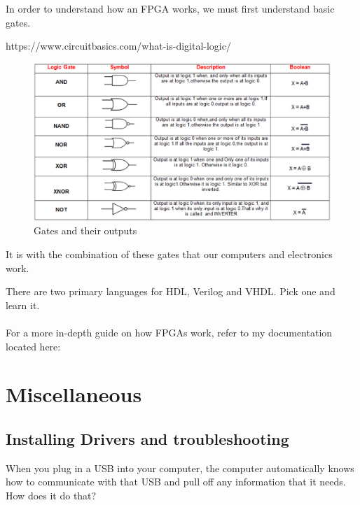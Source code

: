 \documentclass{article}
\begin{document}
In order to understand how an FPGA works, we must first understand basic gates.

https://www.circuitbasics.com/what-is-digital-logic/

\begin{figure}[!phbt]
    \centering
    \includegraphics[width=\linewidth]{img/gates.eps}
    \caption{Gates and their outputs}
    \label{fig:gates}
\end{figure}

It is with the combination of these gates that our computers and electronics work.

There are two primary languages for HDL, Verilog and VHDL. Pick one and learn it.
\\
\
\\
For a more in-depth guide on how FPGAs work, refer to my documentation located here:


\section{Miscellaneous}

\subsection{Installing Drivers and troubleshooting}
When you plug in a USB into your computer, the computer automatically knows how to communicate with that USB and pull off any information that it needs. How does it do that?
\end{document}
